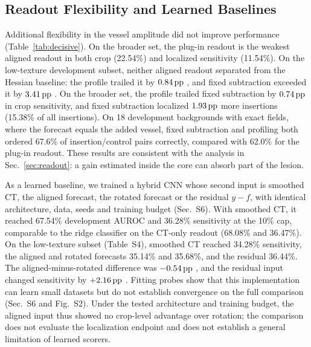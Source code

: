 \subsection{Readout Flexibility and Learned Baselines}
\label{sec:res_gain}
Additional flexibility in the vessel amplitude did not improve performance (Table~\ref{tab:decisive}). On the broader set, the plug-in readout is the weakest aligned readout in both crop (22.54\%) and localized sensitivity (11.54\%). On the low-texture development subset, neither aligned readout separated from the Hessian baseline: the profile trailed it by $0.84\,\mathrm{pp}$ , and fixed subtraction exceeded it by $3.41\,\mathrm{pp}$ . On the broader set, the profile trailed fixed subtraction by $0.74\,\mathrm{pp}$  in crop sensitivity, and fixed subtraction localized $1.93\,\mathrm{pp}$  more insertions (15.38\% of all insertions). On 18 development backgrounds with exact fields, where the forecast equals the added vessel, fixed subtraction and profiling both ordered 67.6\% of insertion/control pairs correctly, compared with 62.0\% for the plug-in readout. These results are consistent with the analysis in Sec.~\ref{sec:readout}: a gain estimated inside the core can absorb part of the lesion.

As a learned baseline, we trained a hybrid CNN whose second input is smoothed CT, the aligned forecast, the rotated forecast or the residual $y-f$, with identical architecture, data, seeds and training budget (Sec.~S6). With smoothed CT, it reached 67.54\% development AUROC and 36.28\% sensitivity at the 10\% cap, comparable to the ridge classifier on the CT-only readout (68.08\% and 36.47\%). On the low-texture subset (Table~S4), smoothed CT reached 34.28\% sensitivity, the aligned and rotated forecasts 35.14\% and 35.68\%, and the residual 36.44\%. The aligned-minus-rotated difference was $-0.54\,\mathrm{pp}$ , and the residual input changed sensitivity by $+2.16\,\mathrm{pp}$ . Fitting probes show that this implementation can learn small datasets but do not establish convergence on the full comparison (Sec.~S6 and Fig.~S2). Under the tested architecture and training budget, the aligned input thus showed no crop-level advantage over rotation; the comparison does not evaluate the localization endpoint and does not establish a general limitation of learned scorers.




